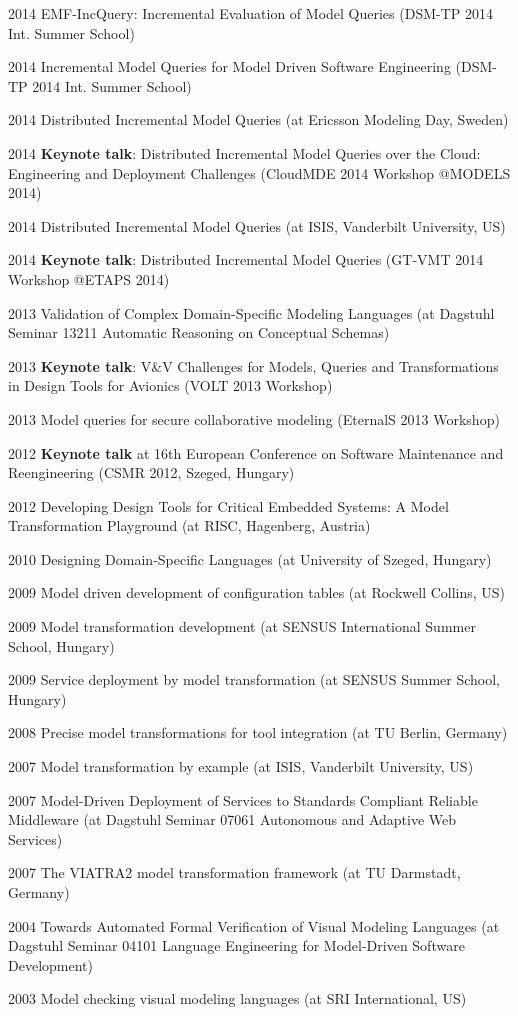 \begin{yearlist}
\item[2014] EMF-IncQuery: Incremental Evaluation of Model Queries (DSM-TP 2014 Int. Summer School)
\item[2014] Incremental Model Queries for Model Driven Software Engineering (DSM-TP 2014 Int. Summer School)
\item[2014] Distributed Incremental Model Queries (at Ericsson Modeling Day, Sweden)
\item[2014] \textbf{Keynote talk}: Distributed Incremental  Model Queries over the Cloud: Engineering and Deployment Challenges (CloudMDE 2014 Workshop @MODELS 2014)
\item[2014] Distributed Incremental Model Queries (at ISIS, Vanderbilt University, US)
\item[2014] \textbf{Keynote talk}: Distributed Incremental Model Queries (GT-VMT 2014 Workshop @ETAPS 2014) 
\item[2013] Validation of Complex Domain-Specific Modeling Languages (at Dagstuhl Seminar 13211 Automatic Reasoning on Conceptual Schemas)
\item[2013] \textbf{Keynote talk}: V\&V Challenges for Models, Queries and Transformations in Design Tools for Avionics (VOLT 2013 Workshop)
\item[2013] Model queries for secure collaborative modeling (EternalS 2013 Workshop) 
\item[2012] \textbf{Keynote talk} at 16th European Conference on Software Maintenance and Reengineering (CSMR 2012, Szeged, Hungary) 
\item[2012] Developing Design Tools for Critical Embedded Systems: A Model Transformation Playground
(at RISC, Hagenberg, Austria) 
\item[2010] Designing Domain-Specific Languages (at University of Szeged, Hungary)
\item[2009] Model driven development of configuration tables (at Rockwell Collins, US)
\item[2009] Model transformation development (at SENSUS International Summer School, Hungary)
\item[2009] Service deployment by model transformation (at SENSUS Summer School, Hungary)
\item[2008] Precise model transformations for tool integration (at TU Berlin, Germany)
\item[2007] Model transformation by example (at ISIS, Vanderbilt University, US)
\item[2007] Model-Driven Deployment of Services to Standards Compliant Reliable Middleware (at Dagstuhl Seminar 07061 Autonomous and Adaptive Web Services)
\item[2007] The VIATRA2 model transformation framework (at TU Darmstadt, Germany)
\item[2004] Towards Automated Formal Verification of Visual Modeling Languages
(at Dagstuhl Seminar 04101 Language Engineering for Model-Driven Software Development) 
\item[2003] Model checking visual modeling languages (at SRI International, US) 
\end{yearlist}

